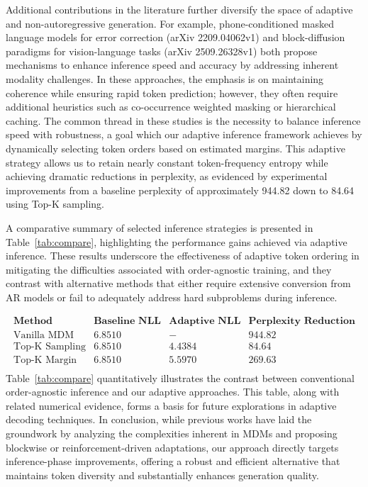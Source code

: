\documentclass{article}
\begin{document}
Additional contributions in the literature further diversify the space of adaptive and non-autoregressive generation. For example, phone-conditioned masked language models for error correction (arXiv 2209.04062v1) and block-diffusion paradigms for vision-language tasks (arXiv 2509.26328v1) both propose mechanisms to enhance inference speed and accuracy by addressing inherent modality challenges. In these approaches, the emphasis is on maintaining coherence while ensuring rapid token prediction; however, they often require additional heuristics such as co-occurrence weighted masking or hierarchical caching. The common thread in these studies is the necessity to balance inference speed with robustness, a goal which our adaptive inference framework achieves by dynamically selecting token orders based on estimated margins. This adaptive strategy allows us to retain nearly constant token-frequency entropy while achieving dramatic reductions in perplexity, as evidenced by experimental improvements from a baseline perplexity of approximately 944.82 down to 84.64 using Top-K sampling.

A comparative summary of selected inference strategies is presented in Table~\ref{tab:compare}, highlighting the performance gains achieved via adaptive inference. These results underscore the effectiveness of adaptive token ordering in mitigating the difficulties associated with order-agnostic training, and they contrast with alternative methods that either require extensive conversion from AR models or fail to adequately address hard subproblems during inference.

\[
\begin{array}{l|ccc}
\textbf{Method} & \textbf{Baseline NLL} & \textbf{Adaptive NLL} & \textbf{Perplexity Reduction} \\
\hline
\text{Vanilla MDM} & 6.8510 & - & 944.82 \\
\text{Top-K Sampling} & 6.8510 & 4.4384 & 84.64 \\
\text{Top-K Margin} & 6.8510 & 5.5970 & 269.63 \\
\end{array}
\]
%
Table~\ref{tab:compare} quantitatively illustrates the contrast between conventional order-agnostic inference and our adaptive approaches. This table, along with related numerical evidence, forms a basis for future explorations in adaptive decoding techniques. In conclusion, while previous works have laid the groundwork by analyzing the complexities inherent in MDMs and proposing blockwise or reinforcement-driven adaptations, our approach directly targets inference-phase improvements, offering a robust and efficient alternative that maintains token diversity and substantially enhances generation quality.
\end{document}
